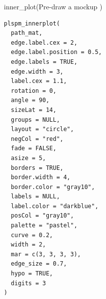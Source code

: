 \documentclass[a4paper]{book}
\begin{document}
%
\begin{Description}
inner\_plot(Pre-draw a mockup )
\end{Description}
%
\begin{Usage}
\begin{verbatim}
plspm_innerplot(
  path_mat,
  edge.label.cex = 2,
  edge.label.position = 0.5,
  edge.labels = TRUE,
  edge.width = 3,
  label.cex = 1.1,
  rotation = 0,
  angle = 90,
  sizeLat = 14,
  groups = NULL,
  layout = "circle",
  negCol = "red",
  fade = FALSE,
  asize = 5,
  borders = TRUE,
  border.width = 4,
  border.color = "gray10",
  labels = NULL,
  label.color = "darkblue",
  posCol = "gray10",
  palette = "pastel",
  curve = 0.2,
  width = 2,
  mar = c(3, 3, 3, 3),
  edge_size = 0.7,
  hypo = TRUE,
  digits = 3
)
\end{verbatim}
\end{Usage}
%
\end{document}
